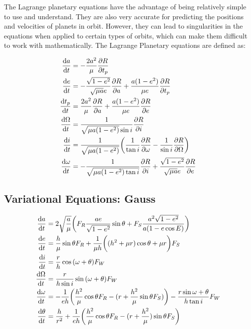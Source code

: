 The Lagrange planetary equations have the advantage of being relatively simple to use and understand. They are also very accurate for predicting the positions and velocities of planets in orbit. However, they can lead to singularities in the equations when applied to certain types of orbits, which can make them difficult to work with mathematically. The Lagrange Planetary equations are defined as:

\begin{equation}
    \begin{aligned}
        \dv{a}{t}&=-\frac{2a^2}{\mu}\pdv{R}{t_p}\\
        \dv{e}{t}&=-\frac{\sqrt{1-e^2}}{\sqrt{\mu{a}}e}\pdv{R}{a} + \frac{a(1-e^2)}{\mu{e}} \pdv{R}{t_p}\\
        \dv{t_p}{t}&=\frac{2a^2}{\mu}\pdv{R}{a}+\frac{a(1-e^2)}{\mu{e}}\pdv{R}{e}\\
        \dv{\Omega}{t}&=\frac{1}{\sqrt{\mu{a}(1-e^2)}\sin{i}}\pdv{R}{i}\\
        \dv{i}{t}&=\frac{1}{\sqrt{\mu{a(1-e^2)}}}\bigg(\frac{1}{\tan{i}}\pdv{R}{\omega}-\frac{1}{\sin{i}}\pdv{R}{\Omega}\bigg)\\
        \dv{\omega}{t}&=-\frac{1}{\sqrt{\mu{a}(1-e^2)\tan{i}}}\pdv{R}{i}+\frac{\sqrt{1-e^2}}{\sqrt{\mu{a}}e}\pdv{R}{e}
    \end{aligned}
\end{equation}

\subsection{Variational Equations: Gauss}

\begin{equation}
    \begin{aligned}
        \dv{a}{t}&=2\sqrt{\frac{a}{\mu}}\bigg(F_R\frac{ae}{\sqrt{1-e^2}}\sin{\theta}+F_S\frac{a^2\sqrt{1-e^2}}{a(1-e\cos{E})}\bigg)\\
        \dv{e}{t}&=\frac{h}{\mu}\sin{\theta}F_R+\frac{1}{\mu{h}}\bigg((h^2+\mu{r})\cos{\theta}+\mu{r}\bigg)F_S\\
        \dv{i}{t}&=\frac{r}{h}\cos{(\omega+\theta)}F_W\\
        \dv{\Omega}{t}&=\frac{r}{h\sin{i}}\sin{(\omega+\theta)}F_W\\
        \dv{\omega}{t}&=-\frac{1}{eh}\bigg(\frac{h^2}{\mu}\cos{\theta}F_R-(r+\frac{h^2}{\mu}\sin{\theta}F_S)\bigg)-\frac{r\sin{\omega+\theta}}{h\tan{i}}F_W\\
        \dv{\theta}{t}&=\frac{h}{r^2}+\frac{1}{eh}\bigg(\frac{h^2}{\mu}\cos{\theta}F_R-(r+\frac{h^2}{\mu})\sin{\theta}F_S\bigg)
    \end{aligned}
\end{equation}

